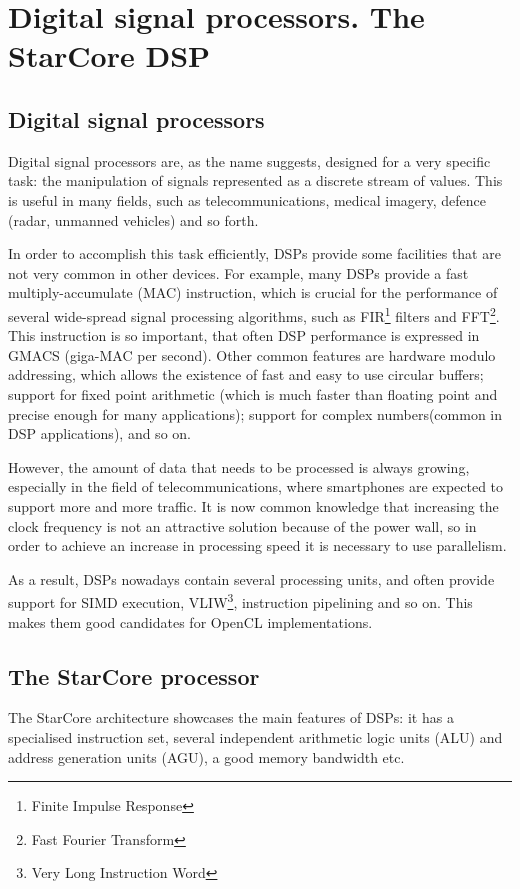 \chapter{Digital signal processors. The StarCore DSP}

\section{Digital signal processors}
\label{section:dsp}
Digital signal processors are, as the name suggests, designed for a very specific task: the manipulation of signals represented as a discrete stream of values. This is useful in many fields, such as telecommunications, medical imagery, defence (radar, unmanned vehicles) and so forth\cite{dspguide}.

In order to accomplish this task efficiently, DSPs provide some facilities that are not very common in other devices. For example, many DSPs provide a fast multiply-accumulate (MAC) instruction, which is crucial for the performance of several wide-spread signal processing algorithms, such as FIR\footnote{Finite Impulse Response} filters and FFT\footnote{Fast Fourier Transform}. This instruction is so important, that often DSP performance is expressed in GMACS (giga-MAC per second). Other common features are hardware modulo addressing, which allows the existence of fast and easy to use circular buffers; support for fixed point arithmetic (which is much faster than floating point and precise enough for many applications); support for complex numbers(common in DSP applications), and so on.

However, the amount of data that needs to be processed is always growing, especially in the field of telecommunications, where smartphones are expected to support more and more traffic. It is now common knowledge that increasing the clock frequency is not an attractive solution because of the power wall\cite{powerwall}, so in order to achieve an increase in processing speed it is necessary to use parallelism.

As a result, DSPs nowadays contain several processing units, and often provide support for SIMD execution, VLIW\footnote{Very Long Instruction Word}, instruction pipelining and so on. This makes them good candidates for OpenCL implementations.


\section{The StarCore processor}
The StarCore architecture showcases the main features of DSPs: it has a specialised instruction set, several independent arithmetic logic units (ALU) and address generation units (AGU), a good memory bandwidth etc.

